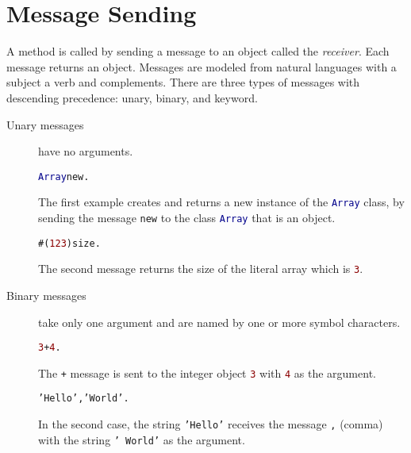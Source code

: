 \section{Message Sending}

A method is called by sending a message to an object called the \emph{receiver}.
Each message returns an object.
Messages are modeled from natural languages with a subject a verb and complements. There are three types of messages with descending precedence: unary, binary, and keyword.

\begin{description}
\item[Unary messages] have no arguments.

\begin{alltt}
\textcolor{darkBlue}{Array} new.
\end{alltt}

The first example creates and returns a new instance of the \textcolor{darkBlue}{\texttt{Array}} class, by sending the message \texttt{new} to the class
\textcolor{darkBlue}{\texttt{Array}} that is an object.

\begin{alltt}
#(\textcolor{darkRed}{1 2 3}) size.
\end{alltt}

The second message returns the size of the literal array which is \textcolor{darkRed}{\texttt{3}}.

\item[Binary messages] take only one argument and are named by one or more symbol characters.

\begin{alltt}
\textcolor{darkRed}{3} + \textcolor{darkRed}{4}.
\end{alltt}

The \texttt{+} message is sent to the integer object \textcolor{darkRed}{\texttt{3}} with \textcolor{darkRed}{\texttt{4}} as the argument.

\begin{alltt}
\textcolor{string}{'Hello'}, \textcolor{string}{' World'}.
\end{alltt}

In the second case, the string \textcolor{string}{\texttt{'Hello'}} receives the message \texttt{,} (comma) with the string \textcolor{string}{\texttt{'~World'}} as the argument.


\end{description}
